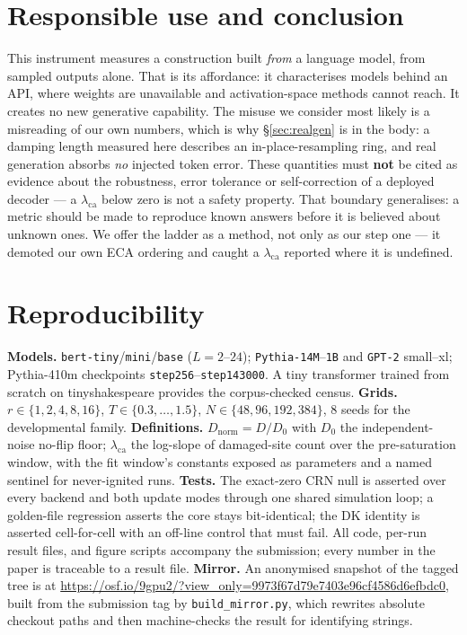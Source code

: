 \documentclass{article}
\newcommand{\dn}{\ensuremath{D_{\mathrm{norm}}}}
\newcommand{\dz}{\ensuremath{D_0}}
\newcommand{\lca}{\ensuremath{\lambda_{\mathrm{ca}}}}
\begin{document}
\section{Responsible use and conclusion}
This instrument measures a construction built \emph{from} a language model, from sampled outputs
alone. That is its affordance: it characterises models behind an API, where weights are
unavailable and activation-space methods cannot reach. It creates no new generative capability. The misuse we consider most likely
is a misreading of our own numbers, which is why \S\ref{sec:realgen} is in the body: a damping
length measured here describes an in-place-resampling ring, and real generation absorbs
\emph{no} injected token error. These quantities must \textbf{not} be cited as
evidence about the robustness, error tolerance or self-correction of a deployed decoder --- a
$\lca$ below zero is not a safety property. That boundary generalises: a metric should be made to
reproduce known
answers before it is believed about unknown ones. We offer the ladder as a method, not only as our step
one --- it demoted our own ECA ordering and caught a $\lca$ reported where it is undefined.




\appendix
\section{Reproducibility}
\textbf{Models.} \texttt{bert-tiny}/\texttt{mini}/\texttt{base} ($L{=}2$--$24$);
\texttt{Pythia-14M}--\texttt{1B} \citep{pythia} and \texttt{GPT-2} small--xl; Pythia-410m
checkpoints \texttt{step256}--\texttt{step143000}. A tiny transformer trained from scratch on
tinyshakespeare provides the corpus-checked census. \textbf{Grids.} $r\in\{1,2,4,8,16\}$,
$T\in\{0.3,\dots,1.5\}$, $N\in\{48,96,192,384\}$, 8 seeds for the developmental family.
\textbf{Definitions.} $\dn=D/\dz$ with \dz{} the independent-noise no-flip floor; \lca{} the
log-slope of damaged-site count over the pre-saturation window, with the fit window's
constants exposed as parameters and a named sentinel for never-ignited runs. \textbf{Tests.}
The exact-zero CRN null is asserted over every backend and both update modes through one
shared simulation loop; a golden-file regression asserts the core stays bit-identical; the DK
identity is asserted cell-for-cell with an off-line control that must fail. All code,
per-run result files, and figure scripts accompany the submission; every number in the paper
is traceable to a result file. \textbf{Mirror.} An anonymised snapshot of the tagged tree is at
\url{https://osf.io/9gpu2/?view_only=9973f67d79e7403e96cf4586d6efbdc0}, built from the submission
tag by \texttt{build\_mirror.py}, which rewrites absolute checkout paths and then machine-checks
the result for identifying strings.
\end{document}
